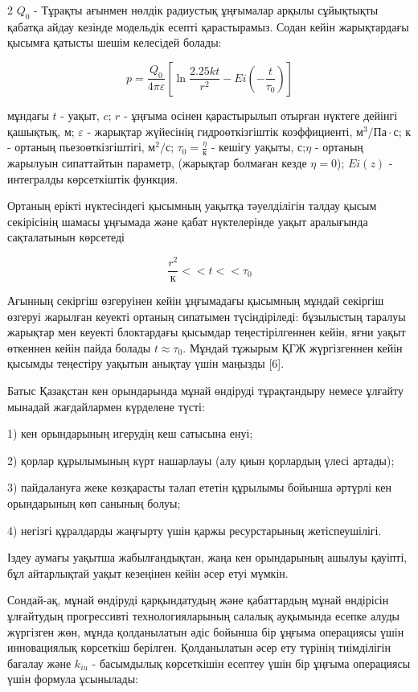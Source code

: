 \begin{multicols}{2}
\(Q_0\) - Тұрақты ағынмен нөлдік радиустық ұңғымалар арқылы сұйықтықты қабатқа
айдау кезінде модельдік есепті қарастырамыз. Содан кейін жарықтардағы
қысымға қатысты шешім келесідей болады:

\begin{equation}
p=\frac{Q_0}{4\pi\varepsilon}\left[\ln\frac{2.25kt}{r^2}-Ei(-\frac{t}{\tau_0})\right]
\end{equation}

мұндағы \(t\) - уақыт, \(c\); \(r\) - ұңғыма осінен қарастырылып
отырған нүктеге дейінгі қашықтық, \(м\); \(\varepsilon\) - жарықтар
жүйесінің гидроөткізгіштік коэффициенті, \(м^3/Па\cdot с\); \(к\) -
ортаның пьезоөткізгіштігі, \(м^2/с\); \(\tau_0=\frac{\eta}{к}\) -
кешігу уақыты, \(с\);\(\eta\) - ортаның жарылуын сипаттайтын параметр,
(жарықтар болмаған кезде \(\eta=0\)); \(Ei(z)\) - интегралды
көрсеткіштік функция.

Ортаның ерікті нүктесіндегі қысымның уақытқа тәуелділігін талдау қысым
секірісінің шамасы ұңғымада және қабат нүктелерінде уақыт аралығында
сақталатынын көрсетеді

\begin{equation*}
\frac{r^2}{к}<<t<<\tau_0
\end{equation*}

Ағынның секіргіш өзгеруінен кейін ұңғымадағы қысымның мұндай секіргіш
өзгеруі жарылған кеуекті ортаның сипатымен түсіндіріледі: бұзылыстың
таралуы жарықтар мен кеуекті блоктардағы қысымдар теңестірілгеннен
кейін, яғни уақыт өткеннен кейін пайда болады \(t\approx\tau_0\).
Мұндай тұжырым ҚГЖ жүргізгеннен кейін қысымды теңестіру уақытын анықтау
үшін маңызды {[}6{]}.

Батыс Қазақстан кен орындарында мұнай өндіруді тұрақтандыру немесе
ұлғайту мынадай жағдайлармен күрделене түсті:

1) кен орындарының игерудің кеш сатысына енуі;

2) қорлар құрылымының күрт нашарлауы (алу қиын қорлардың үлесі артады);

3) пайдалануға жеке көзқарасты талап ететін құрылымы бойынша әртүрлі кен
орындарының көп санының болуы;

4) негізгі құралдарды жаңғырту үшін қаржы ресурстарының жетіспеушілігі.

Іздеу аумағы уақытша жабылғандықтан, жаңа кен орындарының ашылуы
қауіпті, бұл айтарлықтай уақыт кезеңінен кейін әсер етуі мүмкін.

Сондай-ақ, мұнай өндіруді қарқындатудың және қабаттардың мұнай
өндірісін ұлғайтудың прогрессивті технологияларының салалық ауқымында
есепке алуды жүргізген жөн, мұнда қолданылатын әдіс бойынша бір ұңғыма
операциясы үшін инновациялық көрсеткіш берілген. Қолданылатын әсер ету
түрінің тиімділігін бағалау және \(k_{iu}\) - басымдылық көрсеткішін
есептеу үшін бір ұңғыма операциясы үшін формула ұсынылады:


\end{multicols}
